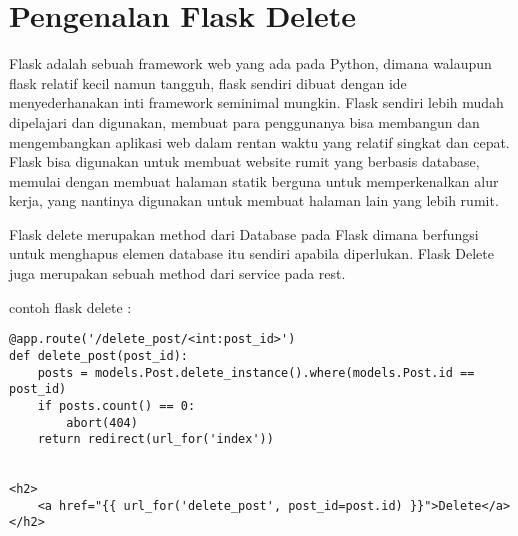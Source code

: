 \section{Pengenalan Flask Delete}
Flask adalah sebuah framework web yang ada pada Python, dimana walaupun flask relatif kecil namun tangguh, flask sendiri dibuat dengan ide menyederhanakan inti framework seminimal mungkin.  Flask sendiri lebih mudah dipelajari dan digunakan, membuat para penggunanya bisa membangun dan mengembangkan aplikasi web dalam rentan waktu yang relatif singkat dan cepat. Flask bisa digunakan  untuk membuat website rumit yang berbasis database, memulai dengan membuat halaman statik berguna untuk memperkenalkan alur kerja, yang nantinya digunakan untuk membuat halaman lain yang lebih rumit.

Flask delete merupakan method dari Database pada Flask dimana berfungsi untuk menghapus elemen database itu sendiri apabila diperlukan. Flask Delete juga merupakan
sebuah method dari service pada rest.

contoh flask delete :

\begin{verbatim}
@app.route('/delete_post/<int:post_id>')
def delete_post(post_id):
    posts = models.Post.delete_instance().where(models.Post.id == post_id)
    if posts.count() == 0:
        abort(404)
    return redirect(url_for('index'))


<h2>
    <a href="{{ url_for('delete_post', post_id=post.id) }}">Delete</a>
</h2>
\end{verbatim}

